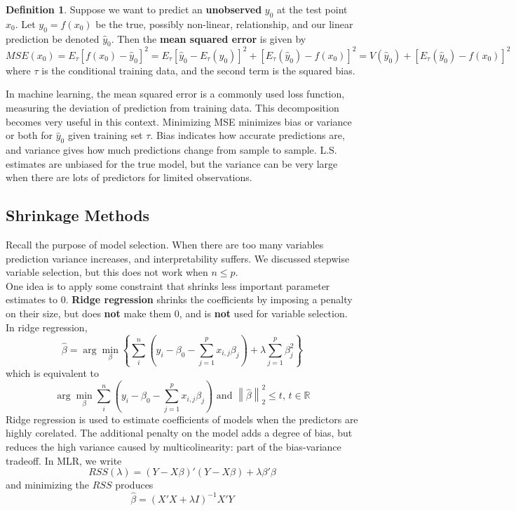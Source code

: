 \documentclass[12pt, a4paper]{article}
\theoremstyle{definition}
\newtheorem{definition}{Definition}
\newcommand{\R}{\mathbb{R}}                           %
\newcommand{\lam}{\lambda}
\newcommand{\BB}[1]{\left(#1\right)}
\newcommand{\norm}[1]{\left\lVert#1\right\rVert}
\begin{document}
	 \begin{definition}
	 	Suppose we want to predict an {\bf unobserved} $y_0$ at the test point $x_0$. Let $y_0 = f(x_0)$ be the true, possibly non-linear, relationship, and our linear prediction be denoted $\hat y_0$. Then the {\bf mean squared error} is given by
	 	$$
	 	MSE(x_0) = E_\tau [f(x_0) - \hat y_0]^2 = E_\tau [\hat y_0 - E_\tau(\hat y_0)]^2 +  [ E_\tau(\hat y_0) - f(x_0)]^2 = V(\hat y_0) + [ E_\tau(\hat y_0) - f(x_0)]^2
	 	$$
	 	where $\tau$ is the conditional training data, and the second term is the squared bias.
	 \end{definition}
 	In machine learning, the mean squared error is a commonly used loss function, measuring the deviation of prediction from training data. This decomposition becomes very useful in this context. Minimizing MSE minimizes bias or variance or both for $\hat y_0$ given training set $\tau$. Bias indicates how accurate predictions are, and variance gives how much predictions change from sample to sample. L.S. estimates are unbiased for the true model, but the variance can be very large when there are lots of predictors for limited observations.
	 
	 \subsection{Shrinkage Methods}
	 
	  Recall the purpose of model selection. When there are too many variables prediction variance increases, and interpretability suffers. We discussed stepwise variable selection, but this does not work when $n \leq p$. \\
	  
	  One idea is to apply some constraint that shrinks less important parameter estimates to $0$. {\bf Ridge regression} shrinks the coefficients by imposing a penalty on their size, but does {\bf not} make them $0$, and is {\bf not} used for variable selection. In ridge regression,
	  $$
	  	\hat \beta = \arg\min_\beta \left\{ \sum_i^n \BB{y_i - \beta_0 - \sum_{j=1}^p x_{i,j} \beta_j} + \lambda \sum_{j=1}^p \beta_j^2  \right\}
	  $$
	  which is equivalent to 
	  $$
	  	\arg\min_\beta \sum_i^n \BB{y_i - \beta_0 - \sum_{j=1}^p x_{i,j} \beta_j} \text{ and } \norm{\hat \beta}_2^2 \leq t,\, t\in \R
	  $$
	 	Ridge regression is used to estimate coefficients of models when the predictors are highly corelated. The additional penalty on the model adds a degree of bias, but reduces the high variance caused by multicolinearity: part of the bias-variance tradeoff. In MLR, we write
	 	$$RSS(\lam) = (Y - X\beta)'(Y - X\beta) + \lambda \beta'\beta$$
	 and minimizing the $RSS$ produces
	 $$\hat \beta = (X'X + \lambda I)^{-1}X'Y$$
	  
\end{document}
